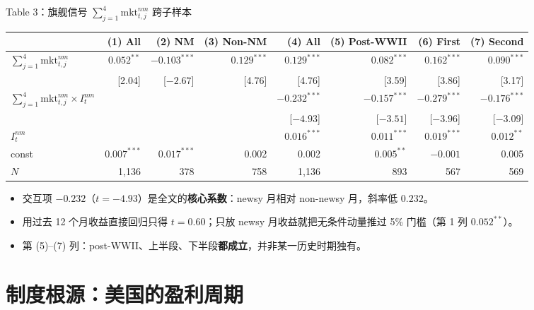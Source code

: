\documentclass[aspectratio=169,10pt]{beamer}
\newcommand{\tighttable}{\scriptsize\setlength{\tabcolsep}{3pt}\renewcommand{\arraystretch}{1.12}}
\newcommand{\flag}{\ensuremath{\textstyle\sum_{j=1}^{4}\mathrm{mkt}^{nm}_{t,j}}}
\begin{document}
\begin{frame}{Table 3：旗舰信号 $\flag$ 跨子样本}
	\tighttable
	\begin{tabular}{lrrrrrrr}
		\toprule
		& (1) All & (2) NM & (3) Non-NM & (4) All & (5) Post-WWII & (6) First & (7) Second \\
		\midrule
		$\flag$ & $0.052^{**}$ & $-0.103^{***}$ & $0.129^{***}$ & $0.129^{***}$ & $0.082^{***}$ & $0.162^{***}$ & $0.090^{***}$ \\
		& [2.04] & [$-2.67$] & [4.76] & [4.76] & [3.59] & [3.86] & [3.17] \\
		$\flag\times I^{nm}_t$ & & & & $-0.232^{***}$ & $-0.157^{***}$ & $-0.279^{***}$ & $-0.176^{***}$ \\
		& & & & [$-4.93$] & [$-3.51$] & [$-3.96$] & [$-3.09$] \\
		$I^{nm}_t$ & & & & $0.016^{***}$ & $0.011^{***}$ & $0.019^{***}$ & $0.012^{**}$ \\
		const & $0.007^{***}$ & $0.017^{***}$ & 0.002 & 0.002 & $0.005^{**}$ & $-0.001$ & 0.005 \\
		$N$ & 1{,}136 & 378 & 758 & 1{,}136 & 893 & 567 & 569 \\
		\bottomrule
	\end{tabular}
	\vspace{3pt}
	\begin{itemize}
		\item 交互项 $-0.232$（$t=-4.93$）是全文的\textbf{核心系数}：newsy 月相对 non-newsy 月，斜率低 $0.232$。
		\item 用过去 12 个月收益直接回归只得 $t=0.60$；只放 newsy 月收益就把无条件动量推过 5\% 门槛（第 1 列 $0.052^{**}$）。
		\item 第 (5)--(7) 列：post-WWII、上半段、下半段\textbf{都成立}，并非某一历史时期独有。
	\end{itemize}
\end{frame}

\section{制度根源：美国的盈利周期}
\end{document}

